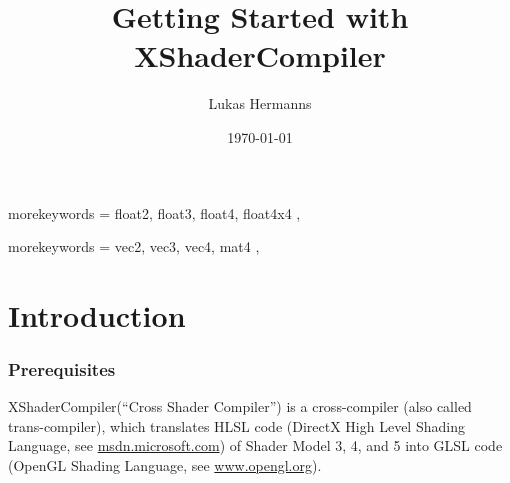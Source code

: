 \documentclass{article}
\title{Getting Started with XShaderCompiler}
\author{Lukas Hermanns}
\date{\today}
\begin{document}

\def\XSC{\textcolor{darkBlueColor}{XShaderCompiler}\xspace}


{
	morekeywords = {
		float2, float3, float4, float4x4 %
	},
}

{
	morekeywords = {
		vec2, vec3, vec4, mat4 %
	},
}

\maketitle


\newpage



\tableofcontents

\newpage



\part{Introduction}



\section{Prerequisites}

\XSC (``Cross Shader Compiler'') is a cross-compiler (also called trans-compiler),
which translates HLSL code (DirectX High Level Shading Language,
see \href{https://msdn.microsoft.com/en-us/library/windows/desktop/bb509561(v=vs.85).aspx}{msdn.microsoft.com}) 
of Shader Model 3, 4, and 5 into GLSL code (OpenGL Shading Language,
see \href{https://www.opengl.org/wiki/OpenGL_Shading_Language}{www.opengl.org}).
\end{document}
